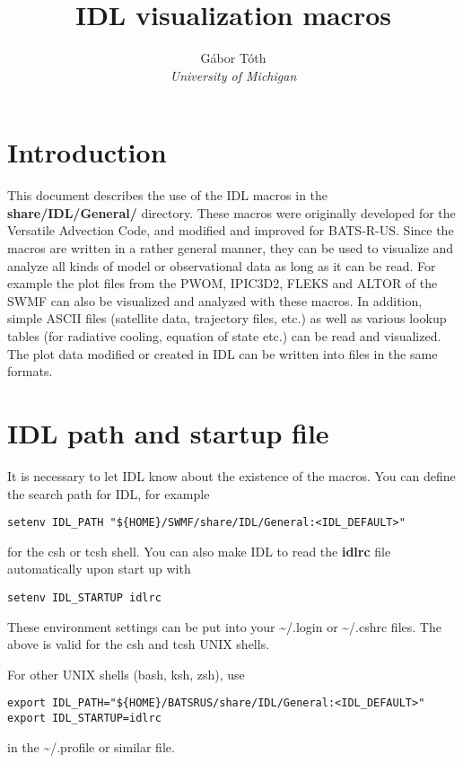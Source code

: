 \documentclass{article}
\title{IDL visualization macros}
\author{G\'abor T\'oth\\{\it University of Michigan}}
\newcommand{\BATSRUS}{BATS-R-US}
\begin{document}
\maketitle

\newpage

\tableofcontents

\newpage

\section{Introduction}

This document describes the use of the IDL macros 
in the {\bf share/IDL/General/} directory.
These macros were originally developed for the Versatile Advection Code,
and modified and improved for \BATSRUS. Since the macros are written
in a rather general manner, they can be used to visualize and analyze all kinds
of model or observational data as long as it can be read. For example
the plot files from the PWOM, IPIC3D2, FLEKS and ALTOR
of the SWMF can also be visualized and analyzed with these macros.
In addition, simple ASCII files (satellite data, trajectory files, etc.)
as well as various lookup tables (for radiative cooling, equation of state etc.)
can be read and visualized. The plot data modified or created in IDL 
can be written into files in the same formats.

\section{IDL path and startup file \label{s-idl-path}}

   It is necessary to let IDL know about the existence of the macros.  
   You can define the search path for IDL, for example
\begin{verbatim}
setenv IDL_PATH "${HOME}/SWMF/share/IDL/General:<IDL_DEFAULT>"
\end{verbatim}
   for the csh or tcsh shell. You can also make IDL to read 
   the {\bf idlrc} file automatically upon start up with
\begin{verbatim}
setenv IDL_STARTUP idlrc
\end{verbatim}
   These environment settings can be put into your \~{}/.login or \~{}/.cshrc 
   files. The above is valid for the csh and tcsh UNIX shells. 

   For other UNIX shells (bash, ksh, zsh), use
\begin{verbatim}
export IDL_PATH="${HOME}/BATSRUS/share/IDL/General:<IDL_DEFAULT>"
export IDL_STARTUP=idlrc
\end{verbatim}
   in the \~{}/.profile or similar file.
\end{document}
